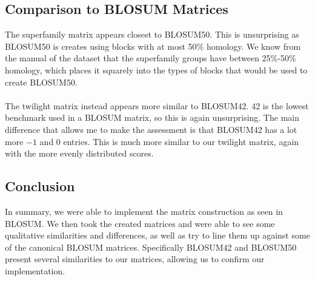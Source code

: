 \documentclass[12pt]{article}
\begin{document}
\subsection{Comparison to BLOSUM Matrices}
The superfamily matrix appears closest to BLOSUM50. This is unsurprising as BLOSUM50 is creates using blocks with at most 50\% homology. We know from the manual of the dataset that the superfamily groups have between 25\%-50\% homology, which places it squarely into the types of blocks that would be used to create BLOSUM50. \\ \\
The twilight matrix instead appears more similar to BLOSUM42. 42 is the lowest benchmark used in a BLOSUM matrix, so this is again unsurprising. The main difference that allows me to make the assessment is that BLOSUM42 has a lot more $-1$ and $0$ entries. This is much more similar to our twilight matrix, again with the more evenly distributed scores.

\subsection{Conclusion}
In summary, we were able to implement the matrix construction as seen in BLOSUM. We then took the created matrices and were able to see some qualitative similarities and differences, as well as try to line them up against some of the canonical BLOSUM matrices. Specifically BLOSUM42 and BLOSUM50 present several similarities to our matrices, allowing us to confirm our implementation.
\end{document}

